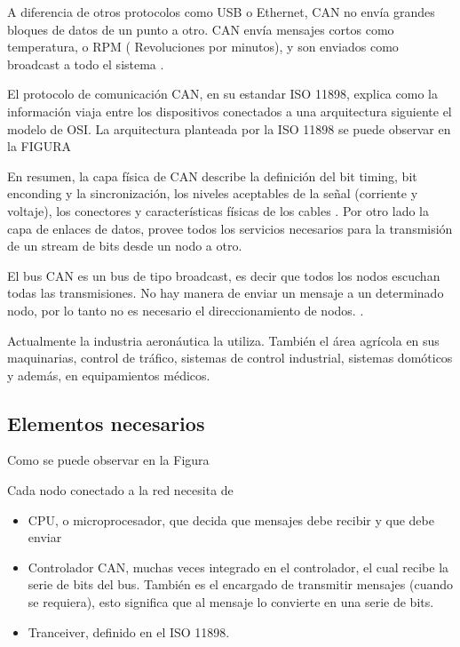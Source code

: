 A diferencia de otros protocolos como USB o Ethernet, CAN no envía grandes bloques de datos de un punto a otro. CAN envía mensajes cortos como temperatura, o RPM ( Revoluciones por minutos), y son enviados como broadcast a todo el sistema \citep{texasCAN}.

El protocolo de comunicación CAN, en su estandar ISO 11898, explica como la información viaja entre los dispositivos conectados a una arquitectura siguiente el modelo de OSI. La arquitectura planteada por la ISO 11898 se puede observar en la FIGURA \citep{texasCAN}


En resumen, la capa física de CAN  describe la definición del bit timing, bit enconding y la sincronización, los niveles aceptables de la señal (corriente y voltaje), los conectores y características físicas de los cables \citep{texasCAN}. Por otro lado la capa de enlaces de datos, provee todos los servicios necesarios para la transmisión de un stream de bits desde un nodo a otro.

El bus CAN es un bus de tipo broadcast, es decir que todos los nodos escuchan todas las transmisiones. No hay manera de enviar un mensaje a un determinado nodo, por lo tanto no es necesario el direccionamiento de nodos. \citep{kvaserWEB}.

Actualmente la industria aeronáutica la utiliza. También el área agrícola en sus maquinarias, control de tráfico, sistemas de control industrial, sistemas domóticos y además, en equipamientos médicos.

\subsection{Elementos necesarios}
Como se puede observar en la Figura 

Cada nodo conectado a la red necesita de
\begin{itemize}
\item \ac{CPU}, o microprocesador, que decida que mensajes debe recibir y que debe enviar
\item Controlador CAN, muchas veces integrado en el controlador, el cual recibe la serie de bits del bus. También es el encargado de transmitir mensajes (cuando se requiera), esto significa que al mensaje lo convierte en una serie de bits.
  \item Tranceiver, definido en el ISO 11898.
\end{itemize}


